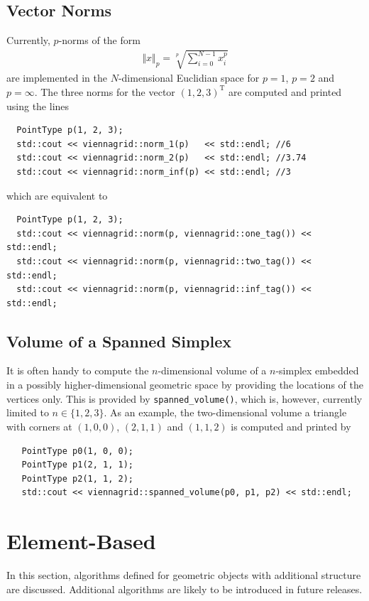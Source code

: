   \subsection{Vector Norms}
 Currently, $p$-norms of the form
  \begin{align}
   \Vert x \Vert_p = \sqrt[p]{\sum_{i=0}^{N-1} x_i^p}
  \end{align}
 are implemented in the $N$-dimensional Euclidian space for $p=1$, $p=2$ and $p=\infty$. The three norms for the vector $(1,2,3)^\mathrm{T}$ are computed and printed using the lines
 \begin{lstlisting}
  PointType p(1, 2, 3);
  std::cout << viennagrid::norm_1(p)   << std::endl; //6
  std::cout << viennagrid::norm_2(p)   << std::endl; //3.74
  std::cout << viennagrid::norm_inf(p) << std::endl; //3
 \end{lstlisting}
which are equivalent to
 \begin{lstlisting}
  PointType p(1, 2, 3);
  std::cout << viennagrid::norm(p, viennagrid::one_tag()) << std::endl;
  std::cout << viennagrid::norm(p, viennagrid::two_tag()) << std::endl;
  std::cout << viennagrid::norm(p, viennagrid::inf_tag()) << std::endl;
 \end{lstlisting}
 

  \subsection{Volume of a Spanned Simplex}
  It is often handy to compute the $n$-dimensional volume of a $n$-simplex embedded in a possibly higher-dimensional geometric space by providing the locations of the vertices only.
  This is provided by \lstinline|spanned_volume()|, which is, however, currently limited to $n \in \{1, 2, 3\}$.
  As an example, the two-dimensional volume a triangle with corners at $(1, 0, 0)$, $(2, 1, 1)$ and $(1, 1, 2)$ is computed and printed by
  \begin{lstlisting}
   PointType p0(1, 0, 0);
   PointType p1(2, 1, 1);
   PointType p2(1, 1, 2);
   std::cout << viennagrid::spanned_volume(p0, p1, p2) << std::endl;
  \end{lstlisting}



\section{Element-Based}
In this section, algorithms defined for geometric objects with additional structure are discussed. Additional algorithms are likely to be introduced in future releases.
 
